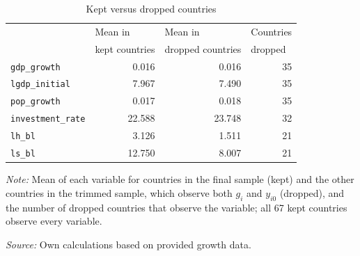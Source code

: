 \begin{table}[!htbp]
\centering
\caption{Kept versus dropped countries}
\label{tab:kept_vs_dropped}
\begin{threeparttable}
\begin{tabular}{lrrr}
\toprule
 & \multicolumn{1}{l}{Mean in} & \multicolumn{1}{l}{Mean in} & \multicolumn{1}{l}{Countries} \\
 & \multicolumn{1}{l}{kept countries} & \multicolumn{1}{l}{dropped countries} & \multicolumn{1}{l}{dropped} \\
\midrule
\texttt{gdp\_growth} & 0.016 & 0.016 & 35 \\
\texttt{lgdp\_initial} & 7.967 & 7.490 & 35 \\
\texttt{pop\_growth} & 0.017 & 0.018 & 35 \\
\texttt{investment\_rate} & 22.588 & 23.748 & 32 \\
\texttt{lh\_bl} & 3.126 & 1.511 & 21 \\
\texttt{ls\_bl} & 12.750 & 8.007 & 21 \\
\bottomrule
\end{tabular}
\begin{tablenotes}[flushleft]
\footnotesize
\item \textit{Note:} Mean of each variable for countries in the final sample (kept) and the other countries in the trimmed sample, which observe both $g_i$ and $y_{i0}$ (dropped), and the number of dropped countries that observe the variable; all 67 kept countries observe every variable.
\item \textit{Source:} Own calculations based on provided growth data.
\end{tablenotes}
\end{threeparttable}
\end{table}